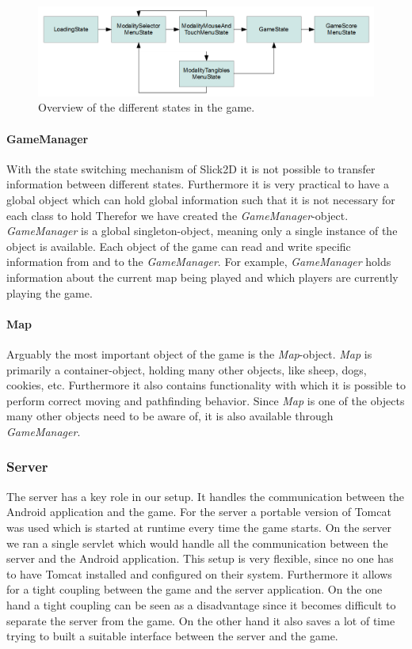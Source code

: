 \documentclass[a4paper,10pt]{article}
\begin{document}
		\begin{figure}
			\includegraphics[width=\columnwidth]{images/game-state-diagram.png}
			\caption{Overview of the different states in the game.}
			\label{fig:game-state-diagram}
		\end{figure}
		
		\paragraph{GameManager}
		With the state switching mechanism of Slick2D it is not possible to transfer information between different states.
		Furthermore it is very practical to have a global object which can hold global information such that it is not necessary for each class to hold 
		Therefor we have created the \emph{GameManager}-object.
		\emph{GameManager} is a global singleton-object, meaning only a single instance of the object is available.
		Each object of the game can read and write specific information from and to the \emph{GameManager}.
		For example, \emph{GameManager} holds information about the current map being played and which players are currently playing the game.		
		
		\paragraph{Map}
		Arguably the most important object of the game is the \emph{Map}-object.
		\emph{Map} is primarily a container-object, holding many other objects, like sheep, dogs, cookies, etc.
		Furthermore it also contains functionality with which it is possible to perform correct moving and pathfinding behavior.
		Since \emph{Map} is one of the objects many other objects need to be aware of, it is also available through \emph{GameManager}.		
		
		\subsubsection{Server}
		The server has a key role in our setup.
		It handles the communication between the Android application and the game.
		For the server a portable version of Tomcat was used which is started at runtime every time the game starts.
		On the server we ran a single servlet which would handle all the communication between the server and the Android application.
		This setup is very flexible, since no one has to have Tomcat installed and configured on their system.
		Furthermore it allows for a tight coupling between the game and the server application.
		On the one hand a tight coupling can be seen as a disadvantage since it becomes difficult to separate the server from the game.
		On the other hand it also saves a lot of time trying to built a suitable interface between the server and the game.
				
\end{document}
